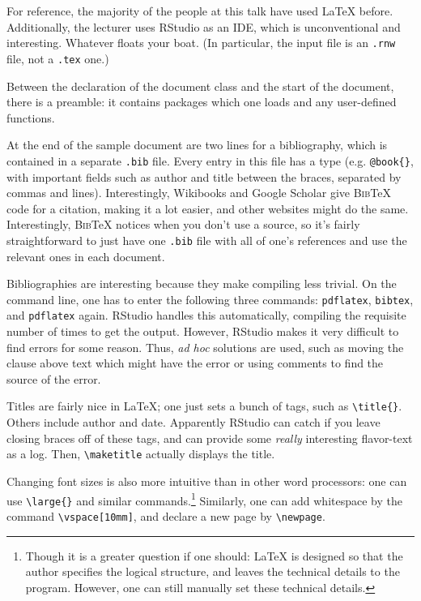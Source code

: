 For reference, the majority of the people at this talk have used \LaTeX{} before. Additionally, the lecturer uses RStudio as an IDE, which is unconventional and interesting. Whatever floats your boat. (In particular, the input file is an \texttt{.rnw} file, not a \texttt{.tex} one.)

Between the declaration of the document class and the start of the document, there is a preamble: it contains packages which one loads and any user-defined functions.

At the end of the sample document are two lines for a bibliography, which is contained in a separate \texttt{.bib} file. Every entry in this file has a type (e.g. \verb+@book{}+, with important fields such as author and title between the braces, separated by commas and lines). Interestingly, Wikibooks and Google Scholar give \textsc{Bib}\TeX{} code for a citation, making it a lot easier, and other websites might do the same. Interestingly, \textsc{Bib}\TeX{} notices when you don't use a source, so it's fairly straightforward to just have one \texttt{.bib} file with all of one's references and use the relevant ones in each document.

Bibliographies are interesting because they make compiling less trivial. On the command line, one has to enter the following three commands: \texttt{pdflatex}, \texttt{bibtex}, and \texttt{pdflatex} again. RStudio handles this automatically, compiling the requisite number of times to get the output. However, RStudio makes it very difficult to find errors for some reason. Thus, \emph{ad hoc} solutions are used, such as moving the \verb++ clause above text which might have the error or using comments to find the source of the error.

Titles are fairly nice in \LaTeX{}; one just sets a bunch of tags, such as \verb+\title{}+. Others include author and date. Apparently RStudio can catch if you leave closing braces off of these tags, and can provide some \emph{really} interesting flavor-text as a log. Then, \verb+\maketitle+ actually displays the title.

Changing font sizes is also more intuitive than in other word processors: one can use \verb+\large{}+ and similar commands.\footnote{Though it is a greater question if one should: \LaTeX{} is designed so that the author specifies the logical structure, and leaves the technical details to the program. However, one can still manually set these technical details.} Similarly, one can add whitespace by the command \verb+\vspace[10mm]+, and declare a new page by \verb+\newpage+.

